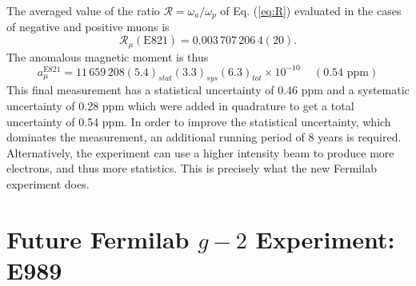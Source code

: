 \documentclass{outhesis}
\begin{document}
The averaged value of the ratio $\mathcal{R} = \omega_a/\omega_p$ of Eq. (\ref{eq:R}) evaluated in the cases of negative and positive muons is
\begin{equation}
\mathcal{R}_{\mu}\left(\text{E821}\right) = 0.003\,707\,206\,4(20).
\end{equation}
The anomalous magnetic moment is thus 
\begin{equation}
a_{\mu}^{\text{E821}} = 11\, 659\, 208  \left(5.4\right)_{stat}  \left(3.3\right)_{sys}  \left(6.3\right)_{tot} \times 10^{-10} \,\,\,\,\,\,\, \left(0.54  \text{ ppm}\right)
\end{equation}
This final measurement has a statistical uncertainty of 0.46 ppm and a systematic uncertainty of 0.28 ppm which were added in quadrature to get a total uncertainty of 0.54 ppm. In order to improve the statistical uncertainty, which dominates the measurement, an additional running period of 8 years is required. Alternatively, the experiment can use a higher intensity beam to produce more electrons, and thus more statistics. This is precisely what the new Fermilab experiment does.

\section{Future Fermilab $g-2$ Experiment: E989}
\end{document}
